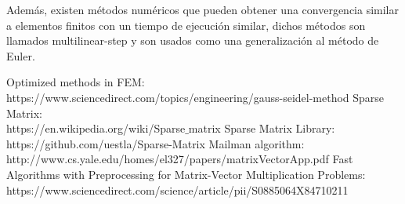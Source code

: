 \documentclass[12pt,a4paper]{article}
\begin{document}
\begin{table}[H]
    \centering
    \caption{Comparación entre Elementos finitos y Diferencias finitas}
\end{table}
Además, existen métodos numéricos que pueden obtener una convergencia similar a elementos finitos con un tiempo de ejecución similar, dichos métodos son llamados multilinear-step y son usados como una generalización al método de Euler. 
\begin{thebibliography}{9}
 Optimized methods in FEM:\\
https://www.sciencedirect.com/topics/engineering/gauss-seidel-method
Sparse Matrix:\\
https://en.wikipedia.org/wiki/Sparse$\_$matrix
Sparse Matrix Library:\\
https://github.com/uestla/Sparse-Matrix
Mailman algorithm:\\
http://www.cs.yale.edu/homes/el327/papers/matrixVectorApp.pdf
Fast Algorithms with Preprocessing for Matrix-Vector Multiplication Problems:\\
https://www.sciencedirect.com/science/article/pii/S0885064X84710211
\end{thebibliography}
\end{document}
